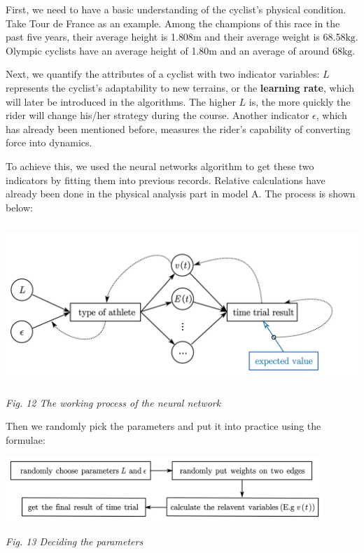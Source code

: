 \documentclass{article}
\begin{document}
			First, we need to have a basic understanding of the cyclist's physical condition. Take Tour de France as an example\cite{france}. Among the champions of this race in the past five years, their average height is 1.808$\mathrm{m}$ and their average weight is 68.58$\mathrm{kg}$. Olympic cyclists have an average height of 1.80$\mathrm{m}$ and an average of around 68$\mathrm{kg}$\cite{weight}.

			Next, we quantify the attributes of a cyclist with two indicator variables: \(L\) represents the cyclist's adaptability to new terrains, or the \textbf{learning rate}, which will later be introduced in the algorithms. The higher \(L\) is, the more quickly the rider will change his/her strategy during the course. Another indicator \(\epsilon\), which has already been mentioned before, measures the rider's capability of converting force into dynamics.

			To achieve this, we used the neural networks algorithm to get these two indicators by fitting them into previous records. Relative calculations have already been done in the physical analysis part in model A. The process is shown below:

			\begin{center}
				\includegraphics[height = 6cm]{neural networks.png}

				\small\textit{Fig. 12 The working process of the neural network}
			\end{center}

			Then we randomly pick the parameters and put it into practice using the formulae:

			\begin{center}
				\includegraphics[width=12cm]{deciding the parameters.png}

				\small\textit{Fig. 13 Deciding the parameters}
			\end{center}
\end{document}
